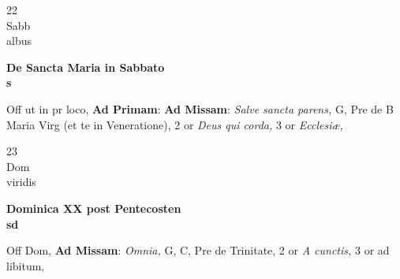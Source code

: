 \documentclass[10pt, openany]{book}
\begin{document}
        \begin{center}
            \begin{minipage}{3.5in}
                \vspace{2em}
                \begin{minipage}{0.5in}
                    {\Huge 22} \\
                    {\normalsize Sabb} \\
                    {\normalsize albus}
                \end{minipage}
                \begin{minipage}{3.0in}
                    \textbf{ \large De Sancta Maria in Sabbato \\
                    \textnormal{\normalsize s}} \\ 
                \end{minipage}
                \begin{justify}Off ut in pr loco, \textbf{Ad Primam}: \textbf{Ad Missam}: \textit{Salve sancta parens,} G, Pre de B Maria Virg (et te in Veneratione), 2 or \textit{Deus qui corda,} 3 or \textit{Ecclesiæ,}   
                \end{justify}
            \end{minipage}
        \end{center}
    
        \begin{center}
            \begin{minipage}{3.5in}
                \vspace{2em}
                \begin{minipage}{0.5in}
                    {\Huge 23} \\
                    {\normalsize Dom} \\
                    {\normalsize viridis}
                \end{minipage}
                \begin{minipage}{3.0in}
                    \textbf{ \large Dominica XX post Pentecosten \\
                    \textnormal{\normalsize sd}} \\ 
                \end{minipage}
                \begin{justify}Off Dom, \textbf{Ad Missam}: \textit{Omnia,} G, C, Pre de Trinitate, 2 or \textit{A cunctis,} 3 or ad libitum,   
                \end{justify}
            \end{minipage}
        \end{center}
    
\end{document}
